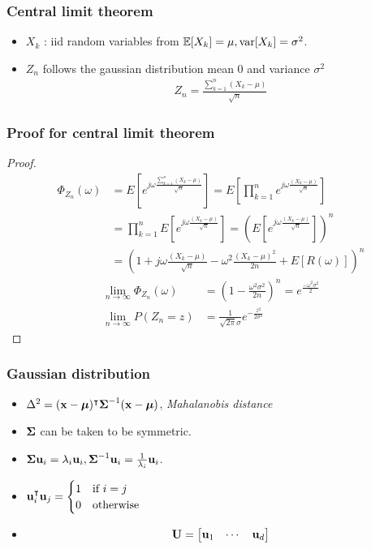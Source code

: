 \documentclass[10pt,mathserif]{beamer}
\begin{document}
\begin{frame}
\frametitle{Central limit theorem}
\begin{itemize}\itemsep=12pt
\item $X_k$ : iid random variables from  $\mathbb{E}[X_k] = \mu, \mathrm{var}[X_k]=\sigma^2$.
\item $Z_n$ follows the gaussian distribution mean 0 and variance $\sigma^2$   
\begin{align}
Z_n=\frac{\sum_{k=1}^{n} (X_k-\mu)}{\sqrt{n}}\nonumber
\end{align}
\end{itemize}
\end{frame}
\begin{frame}
    \frametitle{Proof for central limit theorem}
\begin{proof}
\begin{align}
\Phi_{Z_n}(\omega) &= E[e^{j\omega \frac{\sum_{k=1}^{n} (X_k-\mu)}{\sqrt{n}}}]= E[\prod_{k=1}^{n}e^{j\omega \frac{(X_k-\mu)}{\sqrt{n}}}]\nonumber\\ 
&=\prod_{k=1}^{n}E[e^{j\omega \frac{(X_k-\mu)}{\sqrt{n}}}] = (E[e^{j\omega \frac{(X_k-\mu)}{\sqrt{n}}}])^n \nonumber\\
&=(1+j\omega \frac{(X_k-\mu)}{\sqrt{n}}-\omega^2 \frac{(X_k-\mu)^2}{2n}+E[R(\omega)])^n \nonumber
\end{align}
\begin{align}
\lim_{n\to \infty}\Phi_{Z_n}(\omega)&=(1-\frac{\omega^2\sigma^2}{2n})^n= e^{\frac{-\omega^2\sigma^2}{2}} \nonumber \\
\lim_{n\to \infty} P(Z_n = z)&=\frac{1}{\sqrt{2\pi}\sigma}e^{-\frac{z^2}{2\sigma^2}}\nonumber
\end{align}

\end{proof}

\end{frame}

\begin{frame}
\frametitle{Gaussian distribution}
\begin{itemize}\itemsep=12pt
\item $\Delta^2 = (\mathbf{x}-\boldsymbol{\mu})^\intercal \boldsymbol{\Sigma}^{-1} (\mathbf{x} - \boldsymbol{\mu})$, \textit{Mahalanobis distance}
\item $\boldsymbol{\Sigma}$ can be taken to be symmetric.
\item $\boldsymbol{\Sigma} \mathbf{u}_i = \lambda_i \mathbf{u}_i, \boldsymbol{\Sigma}^{-1} \mathbf{u}_i=\frac{1}{\lambda_i} \mathbf{u}_i$.
\item $\mathbf{u}_i^\intercal \mathbf{u}_j = \begin{cases} 1 &\text{if $i=j$}\\ 0 &\text{otherwise}\end{cases}$
\item 
\begin{align}
\mathbf{U} = \begin{bmatrix} \mathbf{u}_1& \cdots& \mathbf{u}_d \end{bmatrix}\nonumber
\end{align}
\end{itemize}
\end{frame}
\end{document}
